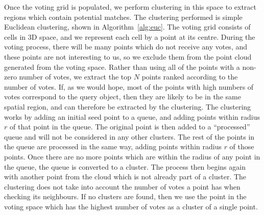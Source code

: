 \documentclass[11pt,a4paper]{kth-mag}
\begin{document}
Once the voting grid is populated, we perform clustering in this space to
extract regions which contain potential matches. The clustering performed is
simple Euclidean clustering, shown in Algorithm~\ref{alg:euc}. The voting grid
consists of cells in 3D space, and we represent each cell by a point at its
centre. During the voting process, there will be many points which do not
receive any votes, and these points are not interesting to us, so we exclude
them from the point cloud generated from the voting space. Rather than using all
of the points with a non-zero number of votes, we extract the top $N$ points
ranked according to the number of votes. If, as we would hope, most of the
points with high numbers of votes correspond to the query object, then they are
likely to be in the same spatial region, and can therefore be extracted by the
clustering. The clustering works by adding an initial seed point to a queue, and
adding points within radius $r$ of that point in the queue. The original point
is then added to a ``processed'' queue and will not be considered in any other
clusters. The rest of the points in the queue are processed in the same way,
adding points within radius $r$ of those points. Once there are no more points
which are within the radius of any point in the queue, the queue is converted to
a cluster. The process then begins again with another point from the cloud which
is not already part of a cluster. The clustering does not take into account the
number of votes a point has when checking its neighbours. If no clusters are
found, then we use the point in the voting space which has the highest number of
votes as a cluster of a single point.
\end{document}
